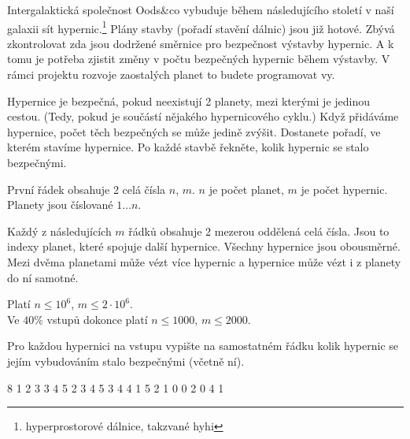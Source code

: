 





Intergalaktická společnost Oods\&co vybuduje
během následujícího století v naší galaxii
sít hypernic.\footnote{hyperprostorové dálnice, takzvané hyhi}
Plány stavby (pořadí stavění dálnic) jsou již hotové.
Zbývá zkontrolovat zda jsou dodržené
směrnice pro bezpečnost výstavby hypernic.
A k tomu je potřeba zjistit změny v počtu
bezpečných hypernic během výstavby.
V rámci projektu rozvoje zaostalých planet
to budete programovat vy.


Hypernice je bezpečná, pokud neexistují 2 planety,
mezi kterými je jedinou cestou.
(Tedy, pokud je součástí nějakého hypernicového cyklu.)
Když přidáváme hypernice, počet těch bezpečných se může jedině zvýšit.
Dostanete pořadí, ve kterém stavíme hypernice.
Po každé stavbě řekněte, kolik hypernic se stalo bezpečnými.


První řádek obsahuje 2 celá čísla $n$, $m$.
$n$ je počet planet,
$m$ je počet hypernic.
Planety jsou číslované $1 \dots n$.

Každý z následujících $m$ řádků obsahuje 2
mezerou oddělená celá čísla.
Jsou to indexy planet, které spojuje další hypernice.
Všechny hypernice jsou obousměrné.
Mezi dvěma planetami může vézt více hypernic
a hypernice může vézt i z planety do ní samotné.

\bigskip

\noindent
Platí $n \leq 10^6$, $m \leq 2\cdot10^6$.\\
Ve $40\%$ vstupů dokonce platí
$n \leq 1000$, $m \leq 2000$.


Pro každou hypernici na vstupu vypište na samostatném řádku
kolik hypernic se jejím vybudováním stalo bezpečnými (včetně ní).



 8
1 2
3 3
4 5
2 3
4 5
3 4
4 1
5 2
1
0
0
2
0
4
1
\sampleEND



